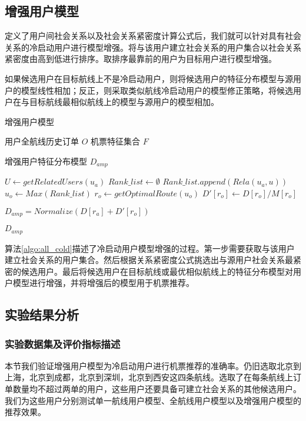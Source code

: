 \subsection{增强用户模型}

定义了用户间社会关系以及社会关系紧密度计算公式后，我们就可以针对具有社会关系的冷启动用户进行模型增强。将与该用户建立社会关系的用户集合以社会关系紧密度由高到低进行排序。取排序最靠前的用户为目标用户进行模型增强。

如果候选用户在目标航线上不是冷启动用户，则将候选用户的特征分布模型与源用户的模型线性相加；反正，则采取类似航线冷启动用户的模型修正策略，将候选用户在与目标航线最相似航线上的模型与源用户的模型相加。

\begin{algorithm}
\caption{增强用户模型}
\label{algo:all_cold}
\begin{algorithmic}[1]
\Require
\Statex 用户全航线历史订单 $O$
\Statex 机票特征集合 $F$

\Ensure 
\Statex 增强用户特征分布模型 $D_{amp}$

\State $U \gets getRelatedUsers(u_a)$
\State $Rank\_list \gets \emptyset$
\State $Rank\_list.append(Rela(u_a,u)) $
\EndFor
\State $u_o \gets Max(Rank\_list)$
\State $r_o \gets getOptimalRoute(u_o)$
\State $D'[r_o] \gets D[r_o] / M[r_o]$

\State $D_{amp} = Normalize(D[r_a] + D'[r_o])$

\State \Return $D_{amp}$
\end{algorithmic}
\end{algorithm}

算法\ref{algo:all_cold}描述了冷启动用户模型增强的过程。第一步需要获取与该用户建立社会关系的用户集合。然后根据关系紧密度公式挑选出与源用户社会关系最紧密的候选用户。最后将候选用户在目标航线或最优相似航线上的特征分布模型对用户模型进行增强，并将增强后的模型用于机票推荐。

\subsection{实验结果分析}

\subsubsection{实验数据集及评价指标描述}

本节我们验证增强用户模型为冷启动用户进行机票推荐的准确率。仍旧选取北京到上海，北京到成都，北京到深圳，北京到西安这四条航线。选取了在每条航线上订单数量均不超过两单的用户，这些用户还要具备可建立社会关系的其他候选用户。我们为这些用户分别测试单一航线用户模型、全航线用户模型以及增强用户模型的推荐效果。

